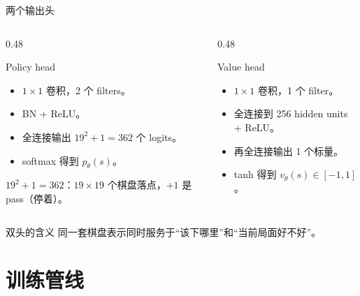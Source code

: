 \documentclass[UTF8,aspectratio=169,10pt]{ctexbeamer}
\begin{document}
\begin{frame}{两个输出头}
  \small
  \begin{columns}[T,onlytextwidth]
    \begin{column}{0.48\textwidth}
      \begin{block}{Policy head}
        \begin{itemize}
          \item $1\times1$ 卷积，2 个 filters。
          \item BN + ReLU。
          \item 全连接输出 $19^2+1=362$ 个 logits。
          \item softmax 得到 $p_{\theta}(s)$。
        \end{itemize}

        \vspace{0.2cm}
        {\small $19^2\!+\!1=362$：$19\times19$ 个棋盘落点，$+1$ 是 pass（停着）。}
      \end{block}
    \end{column}
    \begin{column}{0.48\textwidth}
      \begin{block}{Value head}
        \begin{itemize}
          \item $1\times1$ 卷积，1 个 filter。
          \item 全连接到 256 hidden units + ReLU。
          \item 再全连接输出 1 个标量。
          \item tanh 得到 $v_{\theta}(s)\in[-1,1]$。
        \end{itemize}
      \end{block}
    \end{column}
  \end{columns}

  \begin{alertblock}{双头的含义}
    同一套棋盘表示同时服务于“该下哪里”和“当前局面好不好”。
  \end{alertblock}
\end{frame}

\section{训练管线}
\end{document}
